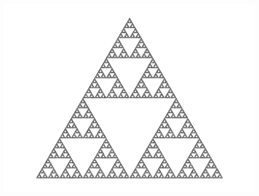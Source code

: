\documentclass[11pt,a4paper]{article}
\theoremstyle{exostyle}
\begin{document}
\begin{center}
		\includegraphics[scale=0.4,trim={1cm 0 1cm 0},clip]{figures-exercices/ifs-02}	
\end{center}
\end{document}

